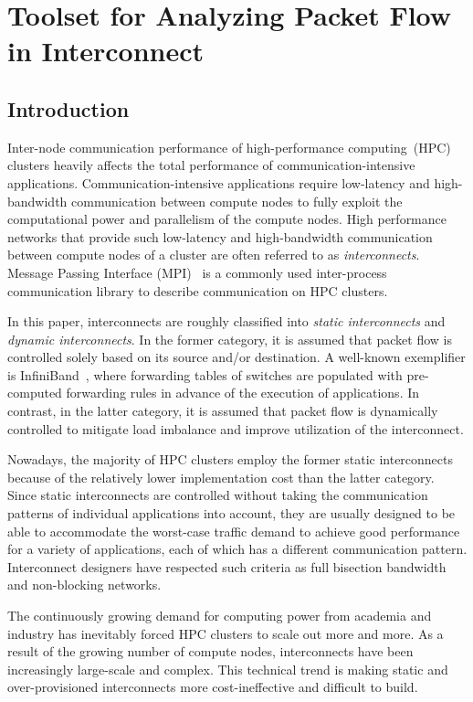 \chapter{Toolset for Analyzing Packet Flow in Interconnect}\label{sec:ii}

\section{Introduction}\label{sec:ii-introduction}

Inter-node communication performance of high-performance computing~(HPC)
clusters heavily affects the total performance of
communication-intensive applications. Communication-intensive
applications require low-latency and high-bandwidth communication
between compute nodes to fully exploit the computational power and
parallelism of the compute nodes. High performance networks that
provide such low-latency and high-bandwidth communication between
compute nodes of a cluster are often referred to as
\emph{interconnects}. Message Passing Interface
(MPI)~\autocite{MessagePassingInterfaceForum2015,Gropp2014} is a
commonly used inter-process communication library to describe
communication on HPC clusters.

In this paper, interconnects are roughly classified into \emph{static
interconnects} and \emph{dynamic interconnects}. In the former category,
it is assumed that packet flow is controlled solely based on its source
and/or destination. A well-known exemplifier is
InfiniBand~\autocite{Buyya2009}, where forwarding tables of
switches are populated with pre-computed forwarding rules in advance of
the execution of applications. In contrast, in the latter category, it
is assumed that packet flow is dynamically controlled to mitigate load
imbalance and improve utilization of the interconnect.

Nowadays, the majority of HPC clusters employ the former static
interconnects because of the relatively lower implementation cost than the
latter category. Since static interconnects are controlled without taking the
communication patterns of individual applications into account, they are
usually designed to be able to accommodate the worst-case traffic demand to
achieve good performance for a variety of applications, each of which has a
different communication pattern. Interconnect designers have respected such
criteria as full bisection bandwidth and non-blocking networks.

The continuously growing demand for computing power from academia and
industry has inevitably forced HPC clusters to scale out more and more.
As a result of the growing number of compute nodes, interconnects
have been increasingly large-scale and complex. This technical trend is making
static and over-provisioned interconnects more cost-ineffective and
difficult to build.

